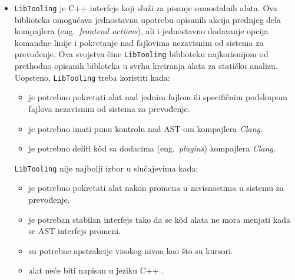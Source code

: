 \documentclass[12pt,oneside]{memoir}
\begin{document}
\begin{itemize}
\item \texttt{LibTooling} je C++ interfejs koji slu\v{z}i za pisanje samostalnih alata. Ova biblioteka omogu\'{c}ava jednostavnu
upotrebu opisanih akcija prednjeg dela kompajlera (eng.~\textit{frontend actions}), ali i jednostavno dodavanje opcija komandne linije i pokretanje nad fajlovima 
nezavisnim od sistema za prevođenje. Ova svojstva \v{c}ine \texttt{LibTooling} biblioteku najkorisnijom od prethodno opisanih bibloteka u svrhu kreiranja alata za stati\v{c}ku analizu.
Uopsteno, \texttt{LibTooling} treba koristiti kada:
\begin{itemize}
  \item je potrebno pokretati alat nad jednim fajlom ili specifi\v{c}nim podskupom fajlova nezavisnim od sistema za prevođenje.
  \item je potrebno imati punu kontrolu nad AST-om kompajlera \textit{Clang}.
  \item je potrebno deliti k\^{o}d sa dodacima (eng.~\textit{plugins}) kompajlera \textit{Clang}.
\end{itemize}
\texttt{LibTooling} nije najbolji izbor u slu\v{c}ajevima kada:
\begin{itemize}
  \item je potrebno pokretati alat nakon promena u zavisnostima u sistemu za prevođenje.
  \item je potreban stabilan interfejs tako da se k\^{o}d alata ne mora menjati kada se AST interfejs promeni.
  \item su potrebne apstrakcije visokog nivoa kao \v{s}to su kursori.
  \item alat ne\'{c}e biti napisan u jeziku C++ \cite{RightInterface}.
\end{itemize}
\end{itemize}
\end{document}
